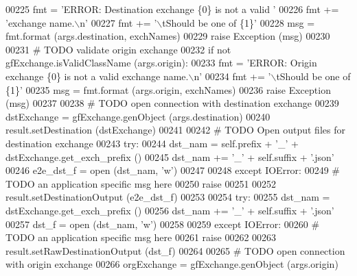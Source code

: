 \begin{DoxyCode}
00225             fmt  = \textcolor{stringliteral}{'ERROR: Destination exchange \{0\} is not a valid '}
00226             fmt += \textcolor{stringliteral}{'exchange name.\(\backslash\)n'}
00227             fmt += \textcolor{stringliteral}{'\(\backslash\)tShould be one of \{1\}'}
00228             msg = fmt.format (args.destination, exchNames)
00229             \textcolor{keywordflow}{raise} Exception (msg)
00230             
00231         \textcolor{comment}{# TODO validate origin exchange}
00232         \textcolor{keywordflow}{if} \textcolor{keywordflow}{not} gfExchange.isValidClassName (args.origin):
00233             fmt  = \textcolor{stringliteral}{'ERROR: Origin exchange \{0\} is not a valid exchange name.\(\backslash\)n'}
00234             fmt += \textcolor{stringliteral}{'\(\backslash\)tShould be one of \{1\}'}
00235             msg = fmt.format (args.origin, exchNames)
00236             \textcolor{keywordflow}{raise} Exception (msg)
00237         
00238         \textcolor{comment}{# TODO open connection with destination exchange}
00239         dstExchange = gfExchange.genObject (args.destination)
00240         result.setDestination (dstExchange)
00241             
00242         \textcolor{comment}{# TODO Open output files for destination exchange}
00243         \textcolor{keywordflow}{try}:
00244             dst\_nam  =  self.prefix + \textcolor{stringliteral}{'\_'} + dstExchange.get\_exch\_prefix ()
00245             dst\_nam += \textcolor{stringliteral}{'\_'} + self.suffix + \textcolor{stringliteral}{'.json'}
00246             e2e\_dst\_f = open (dst\_nam, \textcolor{stringliteral}{'w'})
00247             
00248         \textcolor{keywordflow}{except} IOError:
00249             \textcolor{comment}{# TODO an application specific msg here}
00250             \textcolor{keywordflow}{raise}
00251             
00252         result.setDestinationOutput (e2e\_dst\_f)
00253             
00254         \textcolor{keywordflow}{try}:
00255             dst\_nam  = dstExchange.get\_exch\_prefix ()
00256             dst\_nam += \textcolor{stringliteral}{'\_'} + self.suffix + \textcolor{stringliteral}{'.json'}
00257             dst\_f = open (dst\_nam, \textcolor{stringliteral}{'w'})
00258             
00259         \textcolor{keywordflow}{except} IOError:
00260             \textcolor{comment}{# TODO an application specific msg here}
00261             \textcolor{keywordflow}{raise}
00262             
00263         result.setRawDestinationOutput (dst\_f)
00264             
00265         \textcolor{comment}{# TODO open connection with origin exchange}
00266         orgExchange = gfExchange.genObject (args.origin)

\end{DoxyCode}
